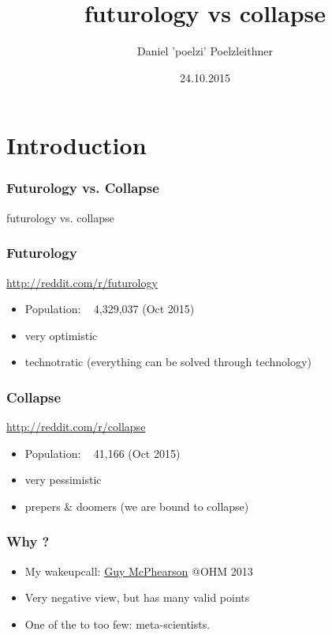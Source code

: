 \documentclass[10pt,handout]{beamer}
\title{futurology vs collapse}
\author{\small Daniel 'poelzi' Poelzleithner}
\date{24.10.2015}
\begin{document}
\maketitle
\tableofcontents[%
	currentsection,
	sectionstyle=show,
]


\section{Introduction}


\begin{frame}
    \frametitle{Futurology vs. Collapse}
    \begin{center}
    futurology vs. collapse
    \end{center}
\end{frame}

\begin{frame}
    \frametitle{Futurology}
    \begin{center}
    \href{http://reddit.com/r/futurology}{http://reddit.com/r/futurology}
    \begin{itemize}
      \item Population: ~ 4,329,037 (Oct 2015)
      \item very optimistic
      \item technotratic (everything can be solved through technology)
\end{itemize}
    \end{center}
\end{frame}

\begin{frame}
    \frametitle{Collapse}
    \begin{center}
      \href{http://reddit.com/r/collapse}{http://reddit.com/r/collapse}
      \begin{itemize}
\item    Population: ~ 41,166 (Oct 2015)
\item    very pessimistic
\item prepers \& doomers (we are bound to collapse)
    \end{itemize}
    \end{center}
\end{frame}

\begin{frame}
    \frametitle{Why ?}
    \begin{center}
      \begin{itemize}
        \item<1-> My wakeupcall: \href{http://guymcpherson.com/}{Guy McPhearson} @OHM 2013
        \item<2-> Very negative view, but has many valid points
        \item<3-> One of the to too few: meta-scientists.
    \end{itemize}
    \end{center}
\end{frame}
\end{document}
